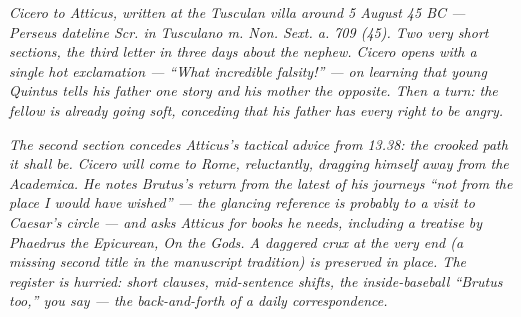 
\textit{Cicero to Atticus, written at the Tusculan villa around 5
August 45 BC --- Perseus dateline \textit{Scr. in Tusculano m.
Non. Sext. a. 709 (45)}. Two very short sections, the third
letter in three days about the nephew. Cicero opens with a
single hot exclamation --- ``What incredible falsity!'' --- on
learning that young Quintus tells his father one story and his
mother the opposite. Then a turn: the fellow is already going
soft, conceding that his father has every right to be angry.}

\textit{The second section concedes Atticus's tactical advice from
13.38: the \textit{crooked path} it shall be. Cicero will come to
Rome, reluctantly, dragging himself away from the
\textit{Academica}. He notes Brutus's return from the latest of
his journeys ``not from the place I would have wished'' --- the
glancing reference is probably to a visit to Caesar's circle ---
and asks Atticus for books he needs, including a treatise by
Phaedrus the Epicurean, \textit{On the Gods}. A daggered crux at
the very end (a missing second title in the manuscript tradition)
is preserved in place. The register is hurried: short clauses,
mid-sentence shifts, the inside-baseball ``Brutus too,'' you
say --- the back-and-forth of a daily correspondence.}
